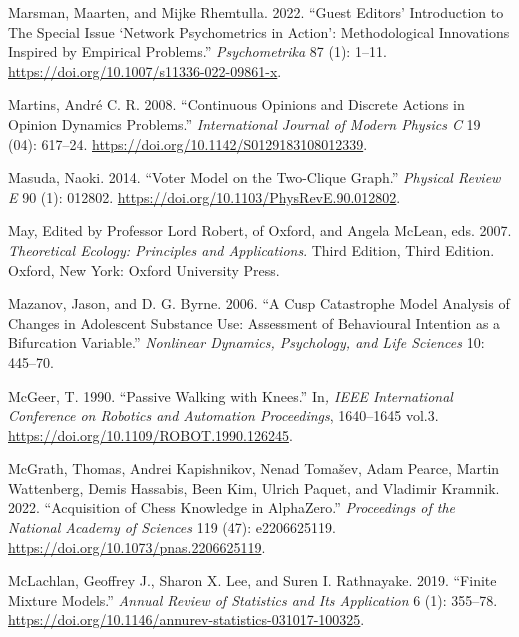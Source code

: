 \documentclass[
  a4paper,
  DIV=11,
  numbers=noendperiod,
  oneside]{scrreprt}
\newlength{\cslhangindent}
\newenvironment{CSLReferences}[2] %
 {\begin{list}{}{%
  \setlength{\itemindent}{0pt}
  \setlength{\leftmargin}{0pt}
  \setlength{\parsep}{0pt}
  \ifodd #1
   \setlength{\leftmargin}{\cslhangindent}
   \setlength{\itemindent}{-1\cslhangindent}
  \fi
  \setlength{\itemsep}{#2\baselineskip}}}
 {\end{list}}
\begin{document}
\begin{CSLReferences}{1}{0}
Marsman, Maarten, and Mijke Rhemtulla. 2022. {``Guest {Editors}'
{Introduction} to {The Special Issue} {`{Network Psychometrics} in
{Action}'}: {Methodological Innovations Inspired} by {Empirical
Problems}.''} \emph{Psychometrika} 87 (1): 1--11.
\url{https://doi.org/10.1007/s11336-022-09861-x}.

Martins, André C. R. 2008. {``Continuous Opinions and Discrete Actions
in Opinion Dynamics Problems.''} \emph{International Journal of Modern
Physics C} 19 (04): 617--24.
\url{https://doi.org/10.1142/S0129183108012339}.

Masuda, Naoki. 2014. {``Voter Model on the Two-Clique Graph.''}
\emph{Physical Review E} 90 (1): 012802.
\url{https://doi.org/10.1103/PhysRevE.90.012802}.

May, Edited by Professor Lord Robert, of Oxford, and Angela McLean, eds.
2007. \emph{Theoretical {Ecology}: {Principles} and {Applications}}.
Third Edition, Third Edition. {Oxford, New York}: {Oxford University
Press}.

Mazanov, Jason, and D. G. Byrne. 2006. {``A {Cusp Catastrophe Model
Analysis} of {Changes} in {Adolescent Substance Use}: {Assessment} of
{Behavioural Intention} as a {Bifurcation Variable}.''} \emph{Nonlinear
Dynamics, Psychology, and Life Sciences} 10: 445--70.

McGeer, T. 1990. {``Passive Walking with Knees.''} In\emph{, {IEEE
International Conference} on {Robotics} and {Automation Proceedings}},
1640--1645 vol.3. \url{https://doi.org/10.1109/ROBOT.1990.126245}.

McGrath, Thomas, Andrei Kapishnikov, Nenad Tomašev, Adam Pearce, Martin
Wattenberg, Demis Hassabis, Been Kim, Ulrich Paquet, and Vladimir
Kramnik. 2022. {``Acquisition of Chess Knowledge in {AlphaZero}.''}
\emph{Proceedings of the National Academy of Sciences} 119 (47):
e2206625119. \url{https://doi.org/10.1073/pnas.2206625119}.

McLachlan, Geoffrey J., Sharon X. Lee, and Suren I. Rathnayake. 2019.
{``Finite {Mixture Models}.''} \emph{Annual Review of Statistics and Its
Application} 6 (1): 355--78.
\url{https://doi.org/10.1146/annurev-statistics-031017-100325}.


\end{CSLReferences}
\end{document}
